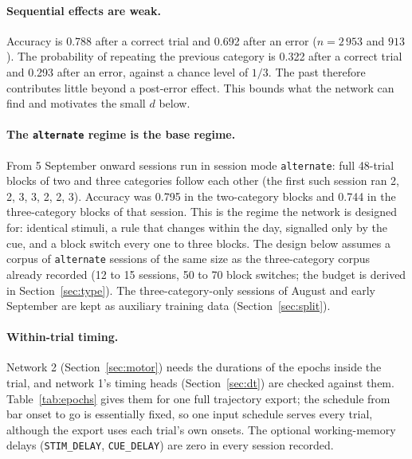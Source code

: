 \documentclass[11pt,a4paper]{article}
\begin{document}
\paragraph{Sequential effects are weak.} Accuracy is 0.788 after a correct trial and
0.692 after an error ($n = 2\,953$ and $913$). The probability of repeating the
previous category is 0.322 after a correct trial and 0.293 after an error, against a
chance level of $1/3$. The past therefore contributes little beyond a post-error effect.
This bounds what the network can find and motivates the small $d$ below.

\paragraph{The \texttt{alternate} regime is the base regime.} From 5 September onward
sessions run in session mode \texttt{alternate}: full 48-trial blocks of two and three
categories follow each other (the first such session ran 2, 2, 3, 3, 2, 2, 3). Accuracy
was 0.795 in the two-category blocks and 0.744 in the three-category blocks of that
session. This is the regime the network is designed for: identical stimuli, a rule that
changes within the day, signalled only by the cue, and a block switch every one to three
blocks. The design below assumes a corpus of \texttt{alternate} sessions of the same
size as the three-category corpus already recorded (12 to 15 sessions, 50 to 70 block
switches; the budget is derived in Section~\ref{sec:type}). The three-category-only sessions of August and early September are
kept as auxiliary training data (Section~\ref{sec:split}).

\paragraph{Within-trial timing.} Network 2 (Section~\ref{sec:motor}) needs the
durations of the epochs inside the trial, and network 1's timing heads
(Section~\ref{sec:dt}) are checked against them. Table~\ref{tab:epochs} gives them for one full trajectory export; the
schedule from bar onset to go is essentially fixed, so one input schedule serves every
trial, although the export uses each trial's own onsets. The optional working-memory
delays (\texttt{STIM\_DELAY}, \texttt{CUE\_DELAY}) are zero in every session recorded.
\end{document}
